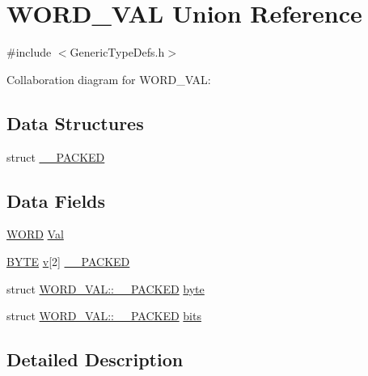 \hypertarget{union_w_o_r_d___v_a_l}{}\section{W\+O\+R\+D\+\_\+\+V\+A\+L Union Reference}
\label{union_w_o_r_d___v_a_l}


{\ttfamily \#include $<$Generic\+Type\+Defs.\+h$>$}



Collaboration diagram for W\+O\+R\+D\+\_\+\+V\+A\+L\+:
\subsection*{Data Structures}
\begin{DoxyCompactItemize}
\item 
struct \hyperlink{struct_w_o_r_d___v_a_l_1_1_____p_a_c_k_e_d}{\+\_\+\+\_\+\+P\+A\+C\+K\+E\+D}
\end{DoxyCompactItemize}
\subsection*{Data Fields}
\begin{DoxyCompactItemize}
\item 
\hyperlink{_generic_type_defs_8h_a2b0e863dadf920709ec53d9088ee7c91}{W\+O\+R\+D} \hyperlink{union_w_o_r_d___v_a_l_aa498550e7f87da9a38dc71609652e6bd}{Val}
\item 
\hyperlink{_generic_type_defs_8h_a4ae1dab0fb4b072a66584546209e7d58}{B\+Y\+T\+E} \hyperlink{_s_p_i_flash_8c_a51a3fc6fe361f8f5a7a91799fecd2c9a}{v}\mbox{[}2\mbox{]} \hyperlink{union_w_o_r_d___v_a_l_acc68fd0f17b26e2eea3d31b1728de49d}{\+\_\+\+\_\+\+P\+A\+C\+K\+E\+D}
\item 
struct \hyperlink{struct_w_o_r_d___v_a_l_1_1_____p_a_c_k_e_d}{W\+O\+R\+D\+\_\+\+V\+A\+L\+::\+\_\+\+\_\+\+P\+A\+C\+K\+E\+D} \hyperlink{union_w_o_r_d___v_a_l_affe411730a20123ff692e4981dd6c916}{byte}
\item 
struct \hyperlink{struct_w_o_r_d___v_a_l_1_1_____p_a_c_k_e_d}{W\+O\+R\+D\+\_\+\+V\+A\+L\+::\+\_\+\+\_\+\+P\+A\+C\+K\+E\+D} \hyperlink{union_w_o_r_d___v_a_l_afe1c6a255c865d41d5a8f80b5b4333f3}{bits}
\end{DoxyCompactItemize}


\subsection{Detailed Description}



